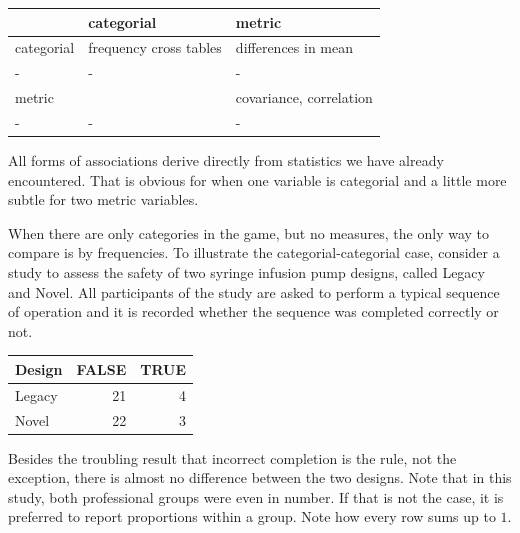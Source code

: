 \documentclass[]{svmono}
\newenvironment{Shaded}{\begin{snugshade}}{\end{snugshade}}
\newcommand{\KeywordTok}[1]{\textcolor[rgb]{0.13,0.29,0.53}{\textbf{#1}}}
\newcommand{\DataTypeTok}[1]{\textcolor[rgb]{0.13,0.29,0.53}{#1}}
\newcommand{\DecValTok}[1]{\textcolor[rgb]{0.00,0.00,0.81}{#1}}
\newcommand{\StringTok}[1]{\textcolor[rgb]{0.31,0.60,0.02}{#1}}
\newcommand{\OperatorTok}[1]{\textcolor[rgb]{0.81,0.36,0.00}{\textbf{#1}}}
\newcommand{\NormalTok}[1]{#1}
\theoremstyle{definition}
\theoremstyle{definition}
\theoremstyle{definition}
\theoremstyle{remark}
\begin{document}
\begin{longtable}[]{@{}lll@{}}
\toprule
& categorial & metric\tabularnewline
\midrule
\endhead
categorial & frequency cross tables & differences in mean\tabularnewline
- & - & -\tabularnewline
metric & & covariance, correlation\tabularnewline
- & - & -\tabularnewline
\bottomrule
\end{longtable}

All forms of associations derive directly from statistics we have
already encountered. That is obvious for when one variable is categorial
and a little more subtle for two metric variables.

When there are only categories in the game, but no measures, the only
way to compare is by frequencies. To illustrate the
categorial-categorial case, consider a study to assess the safety of two
syringe infusion pump designs, called Legacy and Novel. All participants
of the study are asked to perform a typical sequence of operation and it
is recorded whether the sequence was completed correctly or not.

\begin{Shaded}
\end{Shaded}

\begin{tabular}{l|r|r}
\hline
Design & FALSE & TRUE\\
\hline
Legacy & 21 & 4\\
\hline
Novel & 22 & 3\\
\hline
\end{tabular}

Besides the troubling result that incorrect completion is the rule, not
the exception, there is almost no difference between the two designs.
Note that in this study, both professional groups were even in number.
If that is not the case, it is preferred to report proportions within a
group. Note how every row sums up to \(1\).
\end{document}
